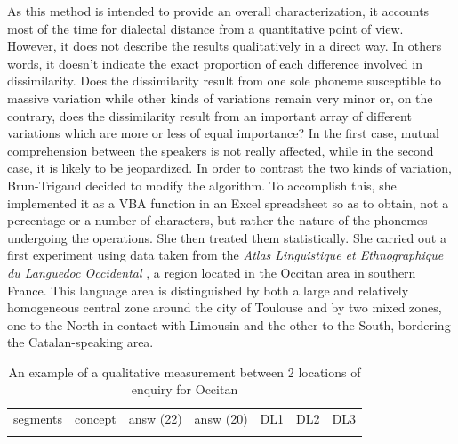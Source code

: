 \documentclass[output=paper]{LSP/langsci}
\begin{document}
As this method is intended to provide an overall characterization, it accounts most of the time for dialectal distance from a quantitative point of view. However, it does not describe the results qualitatively in a direct way. In others words, it doesn’t indicate the exact proportion of each difference involved in dissimilarity. Does the dissimilarity result from one sole phoneme susceptible to massive variation while other kinds of variations remain very minor or, on the contrary, does the dissimilarity result from an important array of different variations which are more or less of equal importance? In the first case, mutual comprehension between the speakers is not really affected, while in the second case, it is likely to be jeopardized. In order to contrast the two kinds of variation, Brun-Trigaud decided to modify the algorithm. To accomplish this, she implemented it as a VBA function in an Excel spreadsheet so as to obtain, not a percentage or a number of characters, but rather the nature of the phonemes undergoing the operations. She then treated them statistically. She carried out a first experiment \citep{brun-trigaud_usage_2014} using data taken from the \textit{Atlas Linguistique et Ethnographique du Languedoc Occidental} \citep{ravier_atlas_1978}, a region located in the Occitan area in southern France. This language area is distinguished by both a large and relatively homogeneous central zone around the city of Toulouse and by two mixed zones, one to the North in contact with Limousin and the other to the South, bordering the Catalan-speaking area.

\begin{table}
\begin{tabular}{lllllll}
\lsptoprule
segments & concept & answ (22) & answ (20) & DL1 & DL2 & DL3\\
\lspbottomrule
\end{tabular}
\caption{An example of a qualitative measurement between 2 locations of enquiry for Occitan}
\label{tab:2}
\end{table}
\end{document}
